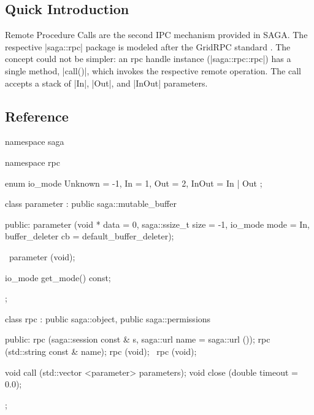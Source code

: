 
 \subsection{Quick Introduction}

  Remote Procedure Calls are the second IPC mechanism provided in
  SAGA.  The respective |saga::rpc| package is modeled after the
  GridRPC standard \cite{gridrpc}.  The concept could not be simpler:
  an rpc handle instance (|saga::rpc::rpc|) has a single method,
  |call()|, which invokes the respective remote operation.  The call
  accepts a stack of |In|, |Out|, and |InOut| parameters.

%
%
%
%
%
%
%
%



 \subsection{Reference}

 \begin{mycode}[label=Prototypes: saga::rpc]

  namespace saga
  {
    namespace rpc 
    {
      enum io_mode
      {
        Unknown = -1,
        In      =  1,
        Out     =  2,
        InOut   =  In | Out
      };
    
      class parameter 
          : public saga::mutable_buffer
      {
        public:
          parameter (void         * data = 0, 
                     saga::ssize_t  size = -1, 
                     io_mode        mode = In,
                     buffer_deleter cb   = default_buffer_deleter);
    
         ~parameter (void);
    
          io_mode get_mode() const;
      }; 
  
      class rpc 
          : public saga::object,
            public saga::permissions
      {
        public:
          rpc (saga::session const & s, 
               saga::url             name = saga::url ());
          rpc (std::string   const & name);
          rpc (void);
         ~rpc (void);
  
          void call  (std::vector <parameter> parameters);
          void close (double timeout = 0.0);
      }; 
    }
  }


\end{mycode}


